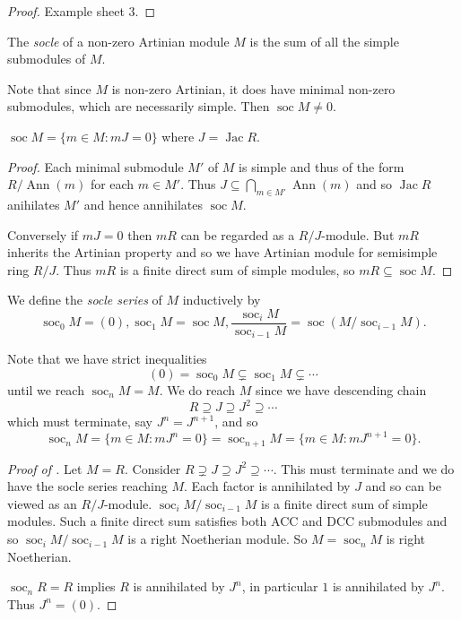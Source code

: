 \documentclass[a4paper]{article}
\DeclareMathOperator{\Ann}{Ann} %
\DeclareMathOperator{\jac}{Jac} %
\DeclareMathOperator{\soc}{soc} %
\begin{document}
\begin{proof}
  Example sheet 3.
\end{proof}

\begin{definition}[socle]
  The \emph{socle} of a non-zero Artinian module \(M\) is the sum of all the simple submodules of \(M\).
\end{definition}

Note that since \(M\) is non-zero Artinian, it does have minimal non-zero submodules, which are necessarily simple. Then \(\soc M \neq 0\).

\begin{lemma}
  \(\soc M = \{m \in M: mJ = 0\}\) where \(J = \jac R\).
\end{lemma}

\begin{proof}
  Each minimal submodule \(M'\) of \(M\) is simple and thus of the form \(R/\Ann(m)\) for each \(m \in M'\). Thus \(J \subseteq \bigcap_{m \in M'} \Ann(m)\) and so \(\jac R\) anihilates \(M'\) and hence annihilates \(\soc M\).

  Conversely if \(mJ = 0\) then \(mR\) can be regarded as a \(R/J\)-module. But \(mR\) inherits the Artinian property and so we have Artinian module for semisimple ring \(R/J\). Thus \(mR\) is a finite direct sum of simple modules, so \(mR \subseteq \soc M\).
\end{proof}

\begin{definition}
  We define the \emph{socle series} of \(M\) inductively by
  \[
    \soc_0 M = (0), \soc_1 M = \soc M, \frac{\soc_i M}{\soc_{i - 1} M} = \soc (M/\soc_{i - 1} M).
  \]
\end{definition}

Note that we have strict inequalities
\[
  (0) = \soc_0 M \subsetneq \soc_1 M \subsetneq \cdots
\]
until we reach \(\soc_n M = M\). We do reach \(M\) since we have descending chain
\[
  R \supseteq J \supseteq J^2 \supseteq \cdots
\]
which must terminate, say \(J^n = J^{n + 1}\), and so
\[
  \soc_n M = \{m \in M: mJ^n = 0\} = \soc_{n + 1} M = \{m \in M: mJ^{n + 1} = 0\}.
\]

\begin{proof}[Proof of ]
  Let \(M = R\). Consider \(R \supsetneq J \supseteq J^2 \supseteq \cdots\). This must terminate and we do have the socle series reaching \(M\). Each factor is annihilated by \(J\) and so can be viewed as an \(R/J\)-module. \(\soc_i M/\soc_{i - 1} M\) is a finite direct sum of simple modules. Such a finite direct sum satisfies both ACC and DCC submodules and so \(\soc_i M/\soc_{i - 1} M\) is a right Noetherian module. So \(M = \soc_n M\) is right Noetherian.

  \(\soc_n R = R\) implies \(R\) is annihilated by \(J^n\), in particular \(1\) is annihilated by \(J^n\). Thus \(J^n = (0)\).
\end{proof}
\end{document}
